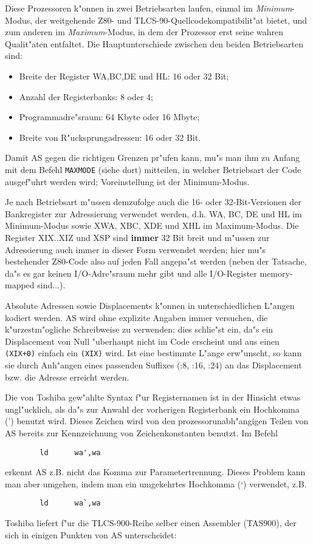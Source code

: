 \documentclass[12pt,a4paper,twoside]{report}
\newcommand{\ii}[1]{{\it #1}}
\newcommand{\bb}[1]{{\bf #1}}
\newcommand{\tty}[1]{{\tt #1}}
\begin{document}
Diese Prozessoren k"onnen in zwei Betriebsarten laufen, einmal im
\ii{Minimum}-Modus, der weitgehende Z80- und TLCS-90-Quellcodekompatibilit"at
bietet, und zum anderen im \ii{Maximum}-Modus, in dem der Prozessor
erst seine wahren Qualit"aten entfaltet.  Die Hauptunterschiede zwischen
den beiden Betriebsarten sind:
\begin{itemize}
\item{Breite der Register WA,BC,DE und HL: 16 oder 32 Bit;}
\item{Anzahl der Registerbanks: 8 oder 4;}
\item{Programmadre"sraum: 64 Kbyte oder 16 Mbyte;}
\item{Breite von R"ucksprungadressen: 16 oder 32 Bit.}
\end{itemize}
Damit AS gegen die richtigen Grenzen pr"ufen kann, mu"s man ihm zu Anfang
mit dem Befehl \tty{MAXMODE} (siehe dort) mitteilen, in welcher Betriebsart
der Code ausgef"uhrt werden wird; Voreinstellung ist der Minimum-Modus.
\par
Je nach Betriebsart m"ussen demzufolge auch die 16- oder 32-Bit-Versionen
der Bankregister zur Adressierung verwendet werden, d.h. WA, BC, DE und HL
im Minimum-Modus sowie XWA, XBC, XDE und XHL im Maximum-Modus.  Die Register
XIX..XIZ und XSP sind \bb{immer} 32 Bit breit und m"ussen zur Adressierung
auch immer in dieser Form verwendet werden; hier mu"s bestehender Z80-Code
also auf jeden Fall angepa"st werden (neben der Tatsache, da"s es gar keinen
I/O-Adre"sraum mehr gibt und alle I/O-Register memory-mapped sind...).
\par
Absolute Adressen sowie Displacements k"onnen in unterschiedlichen L"angen
kodiert werden.  AS wird ohne explizite Angaben immer versuchen, die
k"urzestm"ogliche Schreibweise zu verwenden; dies schlie"st ein, da"s ein
Displacement von Null "uberhaupt nicht im Code erscheint und aus einen
\verb!(XIX+0)! einfach ein \verb!(XIX)! wird.  Ist eine bestimmte L"ange
erw"unscht, so kann sie durch Anh"angen eines passenden Suffixes (:8, :16,
:24) an das Displacement bzw. die Adresse erreicht werden.
\par
Die von Toshiba gew"ahlte Syntax f"ur Registernamen ist in der Hinsicht
etwas ungl"ucklich, als da"s zur Anwahl der vorherigen Registerbank ein
Hochkomma (') benutzt wird.
Dieses Zeichen wird von den prozessorunabh"angigen Teilen von AS bereits zur
Kennzeichnung von Zeichenkonstanten benutzt.  Im Befehl
\begin{verbatim}
        ld      wa',wa
\end{verbatim}
erkennt AS z.B. nicht das Komma zur Parametertrennung.
Dieses Problem kann man aber umgehen,
indem man ein umgekehrtes Hochkomma (`) verwendet, z.B.
\begin{verbatim}
        ld      wa`,wa
\end{verbatim}
Toshiba liefert f"ur die TLCS-900-Reihe selber einen Assembler (TAS900), der
sich in einigen Punkten von AS unterscheidet:
\end{document}
